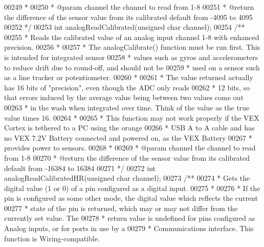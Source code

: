\begin{DoxyCode}
00249 \textcolor{comment}{ *}
00250 \textcolor{comment}{ * @param channel the channel to read from 1-8}
00251 \textcolor{comment}{ * @return the difference of the sensor value from its calibrated default from -4095 to 4095}
00252 \textcolor{comment}{ */}
00253 \textcolor{keywordtype}{int} analogReadCalibrated(\textcolor{keywordtype}{unsigned} \textcolor{keywordtype}{char} channel);
00254 \textcolor{comment}{/**}
00255 \textcolor{comment}{ * Reads the calibrated value of an analog input channel 1-8 with enhanced precision.}
00256 \textcolor{comment}{ *}
00257 \textcolor{comment}{ * The analogCalibrate() function must be run first. This is intended for integrated sensor}
00258 \textcolor{comment}{ * values such as gyros and accelerometers to reduce drift due to round-off, and should not be}
00259 \textcolor{comment}{ * used on a sensor such as a line tracker or potentiometer.}
00260 \textcolor{comment}{ *}
00261 \textcolor{comment}{ * The value returned actually has 16 bits of "precision", even though the ADC only reads}
00262 \textcolor{comment}{ * 12 bits, so that errors induced by the average value being between two values come out}
00263 \textcolor{comment}{ * in the wash when integrated over time. Think of the value as the true value times 16.}
00264 \textcolor{comment}{ *}
00265 \textcolor{comment}{ * This function may not work properly if the VEX Cortex is tethered to a PC using the orange}
00266 \textcolor{comment}{ * USB A to A cable and has no VEX 7.2V Battery connected and powered on, as the VEX Battery}
00267 \textcolor{comment}{ * provides power to sensors.}
00268 \textcolor{comment}{ *}
00269 \textcolor{comment}{ * @param channel the channel to read from 1-8}
00270 \textcolor{comment}{ * @return the difference of the sensor value from its calibrated default from -16384 to 16384}
00271 \textcolor{comment}{ */}
00272 \textcolor{keywordtype}{int} analogReadCalibratedHR(\textcolor{keywordtype}{unsigned} \textcolor{keywordtype}{char} channel);
00273 \textcolor{comment}{/**}
00274 \textcolor{comment}{ * Gets the digital value (1 or 0) of a pin configured as a digital input.}
00275 \textcolor{comment}{ *}
00276 \textcolor{comment}{ * If the pin is configured as some other mode, the digital value which reflects the current}
00277 \textcolor{comment}{ * state of the pin is returned, which may or may not differ from the currently set value. The}
00278 \textcolor{comment}{ * return value is undefined for pins configured as Analog inputs, or for ports in use by a}
00279 \textcolor{comment}{ * Communications interface. This function is Wiring-compatible.}

\end{DoxyCode}
